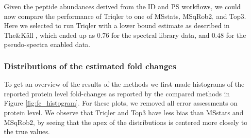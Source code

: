 \documentclass[10pt,letterpaper]{article}
\begin{document}
Given the peptide abundances derived from the ID and PS workflows, we could now compare the performance of Triqler to one of MSstats, MSqRob2, and Top3. Here we selected to run Triqler with a lower bound estimate as described in The\&K\"{a}ll \cite{the2021triqler}, which ended up as 0.76 for the spectral library data, and 0.48 for the pseudo-spectra enabled data.

\subsubsection*{Distributions of the estimated fold changes}

To get an overview of the results of the methods we first made histograms of the reported protein level fold-changes as reported by the compared methods in Figure \ref{fig:fc_histogram}. For these plots, we removed all error assessments on protein level. We observe that Triqler and Top3 have less bias than MSstats and MSqRob2, by seeing that the apex of the distributions is centered more closely to the true values.  
\end{document}
